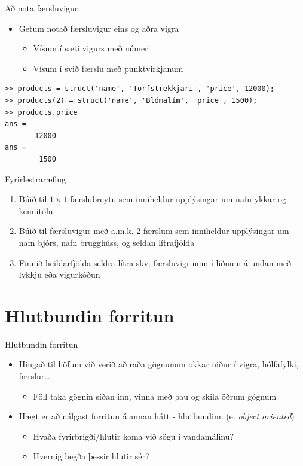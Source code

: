 \documentclass{beamer}
\begin{document}
\begin{frame}[fragile]{Að nota færsluvigur}
\begin{itemize}
 \item Getum notað færsluvigur eins og aðra vigra
 \begin{itemize}
  \item Vísum í sæti vigurs með númeri
  \item Vísum í svið færslu með punktvirkjanum
 \end{itemize}
\end{itemize}
\begin{verbatim}
>> products = struct('name', 'Torfstrekkjari', 'price', 12000);
>> products(2) = struct('name', 'Blómalím', 'price', 1500);
>> products.price
ans =
       12000
ans =
        1500
\end{verbatim}

\end{frame}

\begin{frame}{Fyrirlestraræfing}
\begin{enumerate}
 \item Búið til $1 \times 1$ færslubreytu sem inniheldur upplýsingar um nafn ykkar og kennitölu
 \item Búið til færsluvigur með a.m.k. 2 færslum sem inniheldur upplýsingar um nafn bjórs, nafn brugghúss, og seldan lítrafjölda
 \item Finnið heildarfjölda seldra lítra skv. færsluvigrinum í liðnum á undan með lykkju eða vigurkóðun
\end{enumerate}
\end{frame}

\section{Hlutbundin forritun}

\begin{frame}{Hlutbundin forritun}
\begin{itemize}
 \item Hingað til höfum við verið að raða gögnunum okkar niður í vigra, hólfafylki, færslur\ldots
 \begin{itemize}
  \item Föll taka gögnin síðan inn, vinna með þau og skila öðrum gögnum
 \end{itemize}
 \item Hægt er að nálgast forritun á annan hátt - hlutbundinn (e. \emph{object oriented})
 \begin{itemize}
  \item Hvaða fyrirbrigði/hlutir koma við sögu í vandamálinu?
  \item Hvernig hegða þessir hlutir sér?
 \end{itemize}
\end{itemize}
\end{frame}
\end{document}
